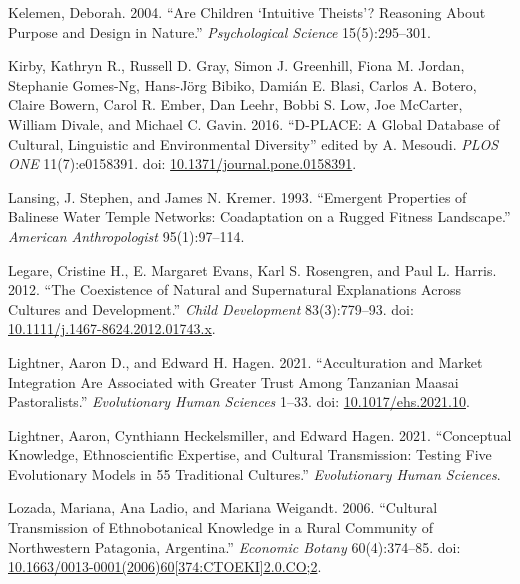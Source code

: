 \documentclass[
  11pt,
]{article}
\begin{document}
\leavevmode\hypertarget{ref-kelemen2004children}{}%
Kelemen, Deborah. 2004. ``Are Children `Intuitive Theists'? Reasoning About Purpose and Design in Nature.'' \emph{Psychological Science} 15(5):295--301.

\leavevmode\hypertarget{ref-kirbyDPLACEGlobalDatabase2016}{}%
Kirby, Kathryn R., Russell D. Gray, Simon J. Greenhill, Fiona M. Jordan, Stephanie Gomes-Ng, Hans-Jörg Bibiko, Damián E. Blasi, Carlos A. Botero, Claire Bowern, Carol R. Ember, Dan Leehr, Bobbi S. Low, Joe McCarter, William Divale, and Michael C. Gavin. 2016. ``D-PLACE: A Global Database of Cultural, Linguistic and Environmental Diversity'' edited by A. Mesoudi. \emph{PLOS ONE} 11(7):e0158391. doi: \href{https://doi.org/10.1371/journal.pone.0158391}{10.1371/journal.pone.0158391}.

\leavevmode\hypertarget{ref-lansingEmergentPropertiesBalinese1993}{}%
Lansing, J. Stephen, and James N. Kremer. 1993. ``Emergent Properties of Balinese Water Temple Networks: Coadaptation on a Rugged Fitness Landscape.'' \emph{American Anthropologist} 95(1):97--114.

\leavevmode\hypertarget{ref-legareCoexistenceNaturalSupernatural2012}{}%
Legare, Cristine H., E. Margaret Evans, Karl S. Rosengren, and Paul L. Harris. 2012. ``The Coexistence of Natural and Supernatural Explanations Across Cultures and Development.'' \emph{Child Development} 83(3):779--93. doi: \href{https://doi.org/10.1111/j.1467-8624.2012.01743.x}{10.1111/j.1467-8624.2012.01743.x}.

\leavevmode\hypertarget{ref-lightnerAcculturationMarketIntegration2021}{}%
Lightner, Aaron D., and Edward H. Hagen. 2021. ``Acculturation and Market Integration Are Associated with Greater Trust Among Tanzanian Maasai Pastoralists.'' \emph{Evolutionary Human Sciences} 1--33. doi: \href{https://doi.org/10.1017/ehs.2021.10}{10.1017/ehs.2021.10}.

\leavevmode\hypertarget{ref-lightnerConceptualKnowledgeEthnoscientificinreview}{}%
Lightner, Aaron, Cynthiann Heckelsmiller, and Edward Hagen. 2021. ``Conceptual Knowledge, Ethnoscientific Expertise, and Cultural Transmission: Testing Five Evolutionary Models in 55 Traditional Cultures.'' \emph{Evolutionary Human Sciences}.

\leavevmode\hypertarget{ref-lozadaCulturalTransmissionEthnobotanical2006}{}%
Lozada, Mariana, Ana Ladio, and Mariana Weigandt. 2006. ``Cultural Transmission of Ethnobotanical Knowledge in a Rural Community of Northwestern Patagonia, Argentina.'' \emph{Economic Botany} 60(4):374--85. doi: \href{https://doi.org/10.1663/0013-0001(2006)60\%5B374:CTOEKI\%5D2.0.CO;2}{10.1663/0013-0001(2006)60{[}374:CTOEKI{]}2.0.CO;2}.
\end{document}
